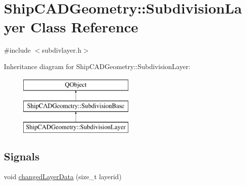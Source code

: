 \hypertarget{classShipCADGeometry_1_1SubdivisionLayer}{\section{Ship\-C\-A\-D\-Geometry\-:\-:Subdivision\-Layer Class Reference}
\label{classShipCADGeometry_1_1SubdivisionLayer}
}


{\ttfamily \#include $<$subdivlayer.\-h$>$}

Inheritance diagram for Ship\-C\-A\-D\-Geometry\-:\-:Subdivision\-Layer\-:\begin{figure}[H]
\begin{center}
\leavevmode
\includegraphics[height=3.000000cm]{classShipCADGeometry_1_1SubdivisionLayer}
\end{center}
\end{figure}
\subsection*{Signals}
\begin{DoxyCompactItemize}
\item 
void \hyperlink{classShipCADGeometry_1_1SubdivisionLayer_a92c3a056412b83396a30cd641bdfdceb}{changed\-Layer\-Data} (size\-\_\-t layerid)
\end{DoxyCompactItemize}
